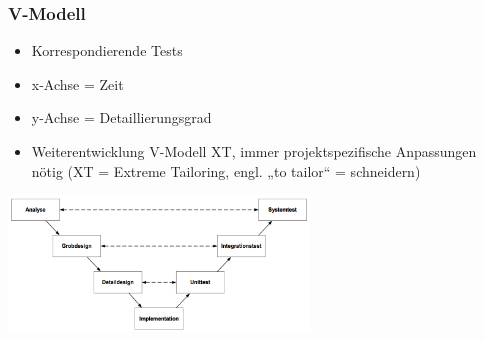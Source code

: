 \subsubsection{V-Modell}
\begin{minipage}{8cm}
	\begin{itemize}
		\item Korrespondierende Tests
		\item x-Achse = Zeit
		\item y-Achse = Detaillierungsgrad
		\item Weiterentwicklung V-Modell XT,\newline
        immer projektspezifische Anpassungen nötig\newline
        (XT = Extreme Tailoring, engl. „to tailor“ = schneidern)
	\end{itemize}
\end{minipage}
\begin{minipage}{8cm}
	\includegraphics[width=8cm]{images/v_modell.png}	
\end{minipage}

